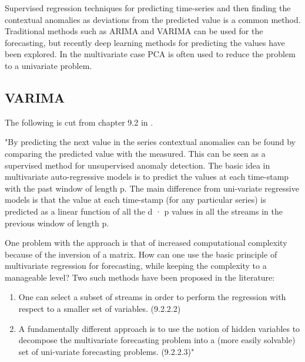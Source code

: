 Supervised regression techniques for predicting time-series and then finding the contextual anomalies as deviations from the predicted value is a common method. Traditional methods such as ARIMA and VARIMA can be used for the forecasting, but recently deep learning methods for predicting the values have been explored. In the multivariate case PCA is often used to reduce the problem to a univariate problem.

\subsection{VARIMA} The following is cut from chapter 9.2 in \cite{Aggarwal2013a}. \newline

"By predicting the next value in the series contextual anomalies can be found by comparing the predicted value with the measured. This can be seen as a supervised method for unsupervised anomaly detection. The basic idea in multivariate auto-regressive models is to predict the values at each time-stamp with the past window of length p. The main difference from uni-variate regressive models is that the value at each time-stamp (for any particular series) is predicted as a linear function of all the d · p values in all the streams in the previous window of length p.

One problem with the approach is that of increased computational complexity because of the inversion of a matrix. How can one use the basic principle of multivariate regression for forecasting, while keeping the complexity to a manageable level? Two such methods have been proposed in the literature:

\begin{enumerate}
    \item One can select a subset of streams in order to perform the regression with respect to a smaller set of variables. (9.2.2.2)
    \item A fundamentally different approach is to use the notion of hidden variables to decompose the multivariate forecasting problem into a (more easily solvable) set of uni-variate forecasting problems. (9.2.2.3)"
\end{enumerate}



